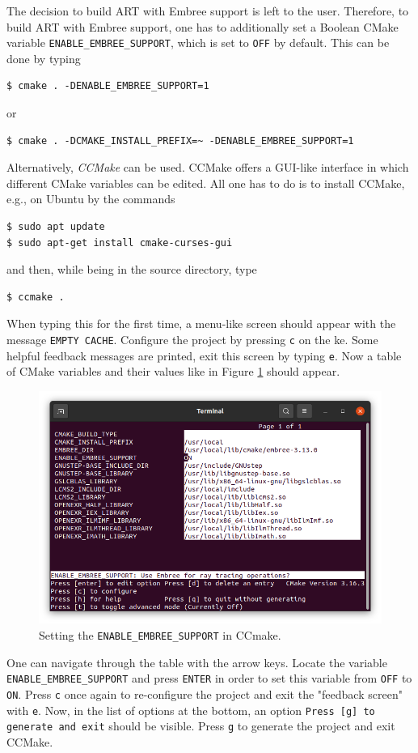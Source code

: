 \begin{enumerate}
	The decision to build ART with Embree support is left to the user. Therefore, to build ART with Embree support, one has to additionally set a Boolean CMake variable \texttt{ENABLE\_EMBREE\_SUPPORT}, which is set to \texttt{OFF} by default. This can be done by typing
\begin{Verbatim}
$ cmake . -DENABLE_EMBREE_SUPPORT=1
\end{Verbatim}
	or
\begin{Verbatim}
$ cmake . -DCMAKE_INSTALL_PREFIX=~ -DENABLE_EMBREE_SUPPORT=1
\end{Verbatim}
	Alternatively, \emph{CCMake} can be used. CCMake offers a GUI-like interface in which different CMake variables can be edited. All one has to do is to install CCMake, e.g., on Ubuntu by the commands
\begin{Verbatim}
$ sudo apt update
$ sudo apt-get install cmake-curses-gui
\end{Verbatim}
	and then, while being in the source directory, type
\begin{Verbatim}
$ ccmake .
\end{Verbatim}
	When typing this for the first time, a menu-like screen should appear with the message \texttt{EMPTY CACHE}. Configure the project by pressing \texttt{c} on the ke.
	Some helpful feedback messages are printed, exit this screen by typing \texttt{e}. Now a table of CMake variables and their values like in Figure \ref{fig:ccmake} should appear.
	\begin{figure}[h]
		\centering
		\includegraphics[width=.8\linewidth]{img/appendix/ccmake.png}
		\caption{Setting the \texttt{ENABLE\_EMBREE\_SUPPORT} in CCmake.}
		\label{fig:ccmake}
	\end{figure}
	One can navigate through the table with the arrow keys. Locate the variable \texttt{ENABLE\_EMBREE\_SUPPORT} and press \texttt{ENTER} in order to set this variable from \texttt{OFF} to \texttt{ON}. Press \texttt{c} once again to re-configure the project and exit the "feedback screen" with \texttt{e}. Now, in the list of options at the bottom, an option \texttt{Press [g] to generate and exit} should be visible. Press \texttt{g} to generate the project and exit CCMake.
	

\end{enumerate}
